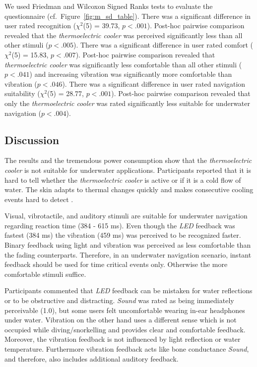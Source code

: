 We used Friedman and Wilcoxon Signed Ranks tests to evaluate the questionnaire (cf.\ Figure~\ref{fig:m_sd_table}).
There was a significant difference in user rated recognition ($\chi^2$(5) = 39.73, $p<.001$).
Post-hoc pairwise comparison revealed that the \emph{thermoelectric cooler} was perceived significantly less than all other stimuli ($p<.005$). \newline
There was a significant difference in user rated comfort ($\chi^2$(5) = 15.83, $p<.007$).
Post-hoc pairwise comparison revealed that \emph{thermoelectric cooler} was significantly less comfortable than all other stimuli ($p<.041$) and increasing vibration was significantly more comfortable than vibration ($p<.046$). \newline
There was a significant difference in user rated navigation suitability ($\chi^2$(5) = 28.77, $p<.001$). 
Post-hoc pairwise comparison revealed that only the \emph{thermoelectric cooler} was rated significantly less suitable for underwater navigation ($p<.004$).

\subsection{Discussion}
The results and the tremendous power consumption show that the \emph{thermoelectric cooler} is not suitable for underwater applications. 
Participants reported that it is hard to tell whether the \emph{thermoelectric cooler} is active or if it is a cold flow of water. 
The skin adapts to thermal changes quickly and makes consecutive cooling events hard to detect \citep{Halvey_thermalFeedback}. 

Visual, vibrotactile, and auditory stimuli are suitable for underwater navigation regarding reaction time (384 - 615 ms). 
Even though the \emph{LED} feedback was fastest (384 ms) the vibration (459 ms) was perceived to be recognized faster. 
Binary feedback using light and vibration was perceived as less comfortable than the fading counterparts. 
Therefore, in an underwater navigation scenario, instant feedback should be used for time critical events only. 
Otherwise the more comfortable stimuli suffice. 

Participants commented that \emph{LED} feedback can be mistaken for water reflections or to be obstructive and distracting. 
\emph{Sound} was rated as being immediately perceivable (1.0), but some users felt uncomfortable wearing in-ear headphones under water. 
Vibration on the other hand uses a different sense which is not occupied while diving/snorkelling and provides clear and comfortable feedback.
Moreover, the vibration feedback is not influenced by light reflection or water temperature.
Furthermore vibration feedback acts like bone conductance \emph{Sound}, and therefore, also includes additional auditory feedback.

